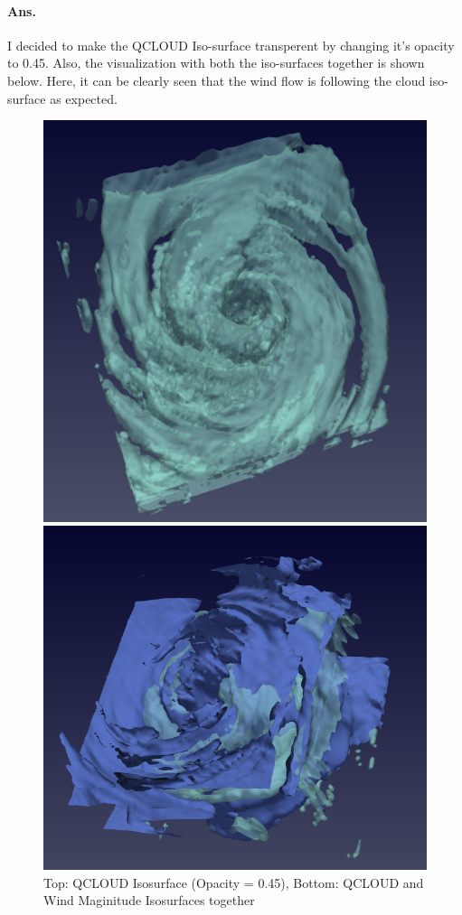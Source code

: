 \documentclass[a4paper,11pt]{article}
\theoremstyle{mytheor}
\begin{document}
\paragraph{Ans.} I decided to make the QCLOUD Iso-surface transperent by changing it's opacity to 0.45. Also, the visualization with both the iso-surfaces together is shown below. Here, it can be clearly seen that the wind flow is following the cloud iso-surface as expected. 
\begin{figure}[!h]
    \centering
    \includegraphics[scale=0.6]{Figures/P1_2_2.PNG}
    
    \vspace{1 cm}
    \includegraphics[scale=0.56]{Figures/P1_3_2.PNG}
    \caption{Top: QCLOUD Isosurface (Opacity = 0.45), Bottom: QCLOUD and Wind Maginitude Isosurfaces together}
    \label{p1_2}
\end{figure}
\end{document}
